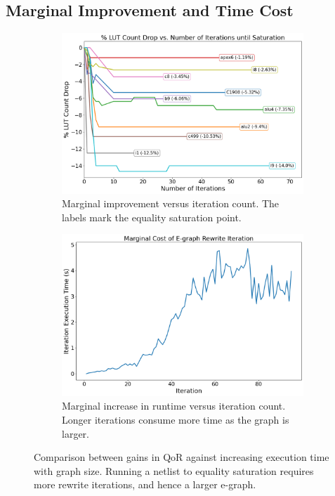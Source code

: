 \subsection{Marginal Improvement and Time Cost}\label{sec:results:margin}
\begin{figure}
    \begin{subfigure}{0.47\textwidth}
        \centering
        \includegraphics[width=\textwidth]{img/improvement.png}
        \caption{Marginal improvement versus iteration count. The labels mark the equality saturation point.}\label{fig:marginal:improvement}
        \Description[]{}
    \end{subfigure}
    \hfill\vspace{4mm}
    \begin{subfigure}{0.47\textwidth}
        \centering
        \includegraphics[width=\textwidth]{img/runtime_derivative.png}
        \caption{Marginal increase in runtime versus iteration count. Longer iterations consume more time as the graph is larger.}\label{fig:marginal:runtime}
        \Description[]{}
    \end{subfigure}
    \caption{Comparison between gains in QoR against increasing execution time with graph size. Running a netlist to equality saturation requires more rewrite iterations, and hence a larger e-graph.}\label{fig:marginal}
    \Description[]{}
\end{figure}

